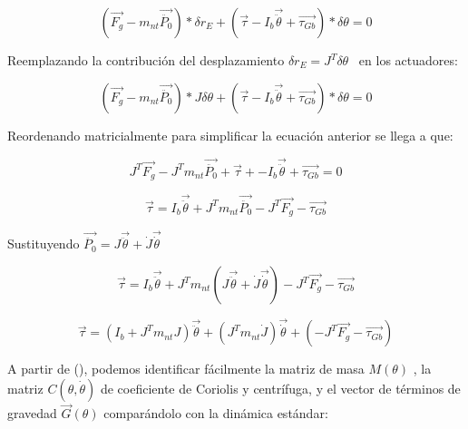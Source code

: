                  \[  \left( \overrightarrow{F_{g}}-m_{nt}\overrightarrow{\ddot{P_{0}}} \right) \ast \delta r_{E}+  \left( \overrightarrow{ \tau}-I_{b}\overrightarrow{\ddot{ \theta }}+\overrightarrow{ \tau_{Gb}} \right) \ast \delta  \theta =0 \] 
                
                Reemplazando la contribución del desplazamiento  \(  \delta r_{E}=J^{T} \delta  \theta  \) \  en los actuadores:
                
                 \[  \left( \overrightarrow{F_{g}}-m_{nt}\overrightarrow{\ddot{P_{0}}} \right) \ast J \delta  \theta +  \left( \overrightarrow{ \tau}-I_{b}\overrightarrow{\ddot{ \theta }}+\overrightarrow{ \tau_{Gb}} \right) \ast \delta  \theta =0 \] 
                
                Reordenando matricialmente para simplificar la ecuación anterior se llega a que: 
                
                 \[ J^{T}\overrightarrow{F_{g}}-J^{T}m_{nt}\overrightarrow{\ddot{P_{0}}}+\overrightarrow{ \tau}+-I_{b}\overrightarrow{\ddot{ \theta }}+\overrightarrow{ \tau_{Gb}}=0 \] 
                
                 \[ \overrightarrow{ \tau}=I_{b}\overrightarrow{\ddot{ \theta }}+J^{T}m_{nt}\overrightarrow{\ddot{P_{0}}}- J^{T}\overrightarrow{F_{g}}-\overrightarrow{ \tau_{Gb}} \] 
                
                Sustituyendo  \( \overrightarrow{\ddot{P_{0}}}=J\overrightarrow{\ddot{ \theta }}+\dot{J}\overrightarrow{\dot{ \theta }} \) 
                
                 \[ \overrightarrow{ \tau}=I_{b}\overrightarrow{\ddot{ \theta }}+J^{T} m_{nt}  \left( J\overrightarrow{\ddot{ \theta }}+\dot{J} \overrightarrow{\dot{ \theta }} \right) - J^{T}\overrightarrow{F_{g}}-\overrightarrow{ \tau_{Gb}} \] 
                
                 \[ \overrightarrow{ \tau}= \left( I_{b}+J^{T} m_{nt} J \right) \overrightarrow{\ddot{ \theta }}+ \left( J^{T} m_{nt}\dot{J} \right)  \overrightarrow{\dot{ \theta }}+ \left( - J^{T}\overrightarrow{F_{g}}-\overrightarrow{ \tau_{Gb}} \right)  \] 
                
                A partir de (), podemos identificar fácilmente la matriz de masa  \( M \left(  \theta  \right)  \) , la matriz  \( C \left(  \theta ,\dot{ \theta } \right)  \)  de coeficiente de Coriolis y centrífuga, y el vector de términos de gravedad  \( \overrightarrow{G} \left(  \theta  \right)  \)  comparándolo con la dinámica estándar:
                
